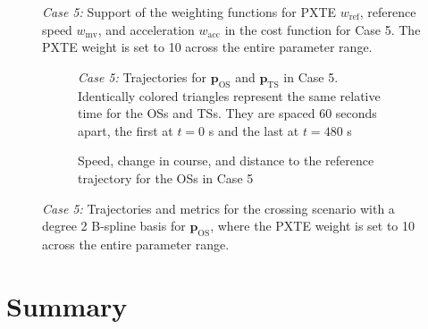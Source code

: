 \begin{figure}[phtb]
    \centering
    
    \caption{\textit{Case 5:} Support of the weighting functions for PXTE $w_\text{ref}$, reference speed $w_\text{mv}$, and acceleration $w_\text{acc}$ in the cost function for Case 5. The PXTE weight is set to 10 across the entire parameter range.}
    \label{fig:weight-functions-confined-waters}
\end{figure}

\begin{figure}
    \centering
    \begin{subfigure}[b]{\textwidth}
        \centering
        
        \caption{\textit{Case 5:} Trajectories for $\mathbf p_\text{OS}$ and $\mathbf p_\text{TS}$ in Case 5. Identically colored triangles represent the same relative time for the OSs and TSs. They are spaced 60 seconds apart, the first at $t=0$ s and the last at $t=480$ s}
        \label{fig:crossing-advanced-scenario-10-2-xte-weight-traj}
    \end{subfigure}
    \begin{subfigure}[b]{\textwidth}
        \centering
        
        \caption{Speed, change in course, and distance to the reference trajectory for the OSs in Case 5}
        \label{fig:crossing-advanced-scenario-10-2-xte-weight}
    \end{subfigure}
    \caption{\textit{Case 5:} Trajectories and metrics for the crossing scenario with a degree 2 B-spline basis for $\mathbf p_\text{OS}$, where the PXTE weight is set to 10 across the entire parameter range.}
\end{figure}





\section{Summary}

